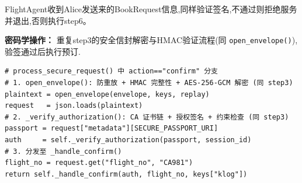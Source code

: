 \item [step5] FlightAgent收到Alice发送来的BookRequest信息,同样验证签名,不通过则拒绝服务并退出,否则执行step6。

    \textbf{密码学操作：} 重复step3的安全信封解密与HMAC验证流程(同 \texttt{open\_envelope()}),验签通过后执行预订.

\begin{lstlisting}[caption={agents/flight\_agent.py — process\_secure\_request() confirm 分支}]
# process_secure_request() 中 action=="confirm" 分支
# 1. open_envelope(): 防重放 + HMAC 完整性 + AES-256-GCM 解密 (同 step3)
plaintext = open_envelope(envelope, keys, replay)
request   = json.loads(plaintext)
# 2. _verify_authorization(): CA 证书链 + 授权签名 + 约束检查 (同 step3)
passport = request["metadata"][SECURE_PASSPORT_URI]
auth     = self._verify_authorization(passport, session_id)
# 3. 分发至 _handle_confirm()
flight_no = request.get("flight_no", "CA981")
return self._handle_confirm(auth, flight_no, keys["klog"])
\end{lstlisting}